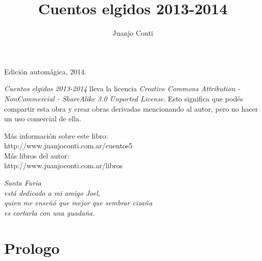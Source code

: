 \documentclass[12pt,twoside,openright,a5paper]{book}
\title{Cuentos elgidos 2013-2014}
\author{Juanjo Conti}
\date{}
\begin{document}
\pagestyle{plain}

\maketitle

\cleardoublepage

\thispagestyle{empty}
\noindent
Edición automágica, 2014.\\

\vspace{0.5cm}

\noindent
\emph{Cuentos elgidos 2013-2014} lleva la licencia 
\emph{Creative Commons Attribution - NonCommercial - ShareAlike 3.0 Unported License}.
Esto significa que podés compartir esta obra y crear obras derivadas
mencionando al autor, pero no ha\-cer un uso comercial de ella.

\vfill

\noindent
Más información sobre este libro:\\
http://www.juanjoconti.com.ar/cuentos5\\

\noindent
Más libros del autor:\\
http://www.juanjoconti.com.ar/libros

\cleardoublepage

\noindent
\begin{flushright}
\emph{
\emph{Santa Furia}\\
está dedicado a mi amigo Joel,\\
quien me enseñó que mejor que sembrar cizaña\\
es cortarla con una guadaña.
}
\end{flushright}

\cleardoublepage

\renewcommand*\contentsname{Índice}

\tableofcontents

\chapter*{Prologo}


 
 
 
 
 
 
 
 
 
 
 
 
 
 
\end{document}
